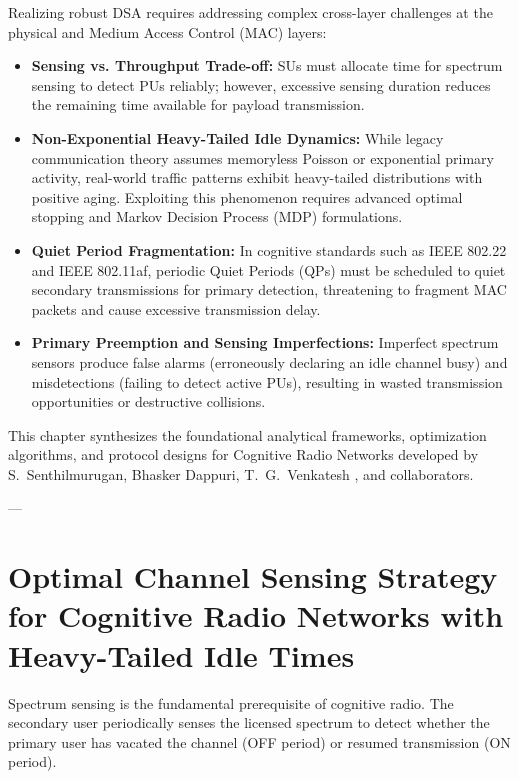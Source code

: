 Realizing robust DSA requires addressing complex cross-layer challenges at the physical and Medium Access Control (MAC) layers:
\begin{itemize}
    \item \textbf{Sensing vs. Throughput Trade-off:} SUs must allocate time for spectrum sensing to detect PUs reliably; however, excessive sensing duration reduces the remaining time available for payload transmission.
    \item \textbf{Non-Exponential Heavy-Tailed Idle Dynamics:} While legacy communication theory assumes memoryless Poisson or exponential primary activity, real-world traffic patterns exhibit heavy-tailed distributions with positive aging. Exploiting this phenomenon requires advanced optimal stopping and Markov Decision Process (MDP) formulations.
    \item \textbf{Quiet Period Fragmentation:} In cognitive standards such as IEEE 802.22 and IEEE 802.11af, periodic Quiet Periods (QPs) must be scheduled to quiet secondary transmissions for primary detection, threatening to fragment MAC packets and cause excessive transmission delay.
    \item \textbf{Primary Preemption and Sensing Imperfections:} Imperfect spectrum sensors produce false alarms (erroneously declaring an idle channel busy) and misdetections (failing to detect active PUs), resulting in wasted transmission opportunities or destructive collisions.
\end{itemize}

This chapter synthesizes the foundational analytical frameworks, optimization algorithms, and protocol designs for Cognitive Radio Networks developed by S.~Senthilmurugan, Bhasker Dappuri, T.~G.~Venkatesh , and collaborators\cite{senthilmurugan2017optimal, senthilmurugan2017channel, senthilmurugan2017quiet, dappuri2018cognitive, dappuri2018multichannel, dappuri2018analytical}.

---

\section{Optimal Channel Sensing Strategy for Cognitive Radio Networks with Heavy-Tailed Idle Times}
\label{sec:cr_optimal_sensing}

Spectrum sensing is the fundamental prerequisite of cognitive radio. The secondary user periodically senses the licensed spectrum to detect whether the primary user has vacated the channel (OFF period) or resumed transmission (ON period).

